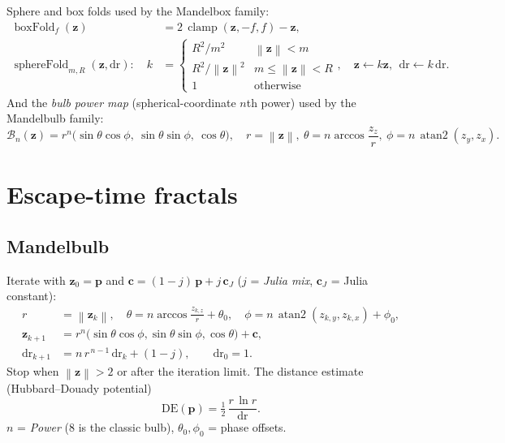 \documentclass[10pt,a4paper]{article}
\newcommand{\vv}[1]{\mathbf{#1}}
\newcommand{\norm}[1]{\left\lVert#1\right\rVert}
\newcommand{\clamp}{\operatorname{clamp}}
\newcommand{\atantwo}{\operatorname{atan2}}
\newcommand{\DE}{\mathrm{DE}}
\newcommand{\sfold}{\operatorname{sphereFold}}
\newcommand{\bfold}{\operatorname{boxFold}}
\begin{document}
Sphere and box folds used by the Mandelbox family:
\begin{align}
\bfold_f(\vv z)&=2\,\clamp(\vv z,-f,f)-\vv z,\\
\sfold_{m,R}(\vv z,\mathrm{dr}):\quad k&=\begin{cases}R^2/m^2& \norm{\vv z}<m\\ R^2/\norm{\vv z}^2& m\le\norm{\vv z}<R\\ 1&\text{otherwise}\end{cases},\quad \vv z\leftarrow k\vv z,\ \ \mathrm{dr}\leftarrow k\,\mathrm{dr}.
\end{align}
And the \emph{bulb power map} (spherical-coordinate $n$th power) used by the Mandelbulb family:
\begin{equation}
\mathcal B_n(\vv z)=r^{n}\big(\sin\theta\cos\phi,\ \sin\theta\sin\phi,\ \cos\theta\big),\quad r=\norm{\vv z},\ \theta=n\arccos\frac{z_z}{r},\ \phi=n\,\atantwo(z_y,z_x).
\end{equation}

\section{Escape-time fractals}

\subsection{Mandelbulb}
Iterate with $\vv z_0=\vv p$ and $\vv c=(1-j)\,\vv p+j\,\vv c_J$ ($j$ = \emph{Julia mix}, $\vv c_J$ = Julia constant):
\begin{align}
r&=\norm{\vv z_k},\quad \theta=n\arccos\frac{z_{k,z}}{r}+\theta_0,\quad \phi=n\,\atantwo(z_{k,y},z_{k,x})+\phi_0,\\
\vv z_{k+1}&=r^{n}\big(\sin\theta\cos\phi,\sin\theta\sin\phi,\cos\theta\big)+\vv c,\\
\mathrm{dr}_{k+1}&=n\,r^{\,n-1}\,\mathrm{dr}_k+(1-j),\qquad \mathrm{dr}_0=1.
\end{align}
Stop when $\norm{\vv z}>2$ or after the iteration limit. The distance estimate (Hubbard--Douady potential)
\begin{equation}\DE(\vv p)=\tfrac12\,\frac{r\,\ln r}{\mathrm{dr}}.\end{equation}
$n$ = \emph{Power} (8 is the classic bulb), $\theta_0,\phi_0$ = phase offsets.

\end{document}
